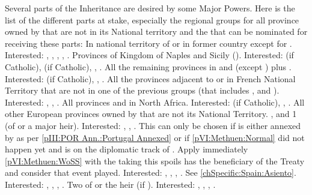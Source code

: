 \aparag Several parts of the Inheritance are desired by some Major Powers.
Here is the list of the different parts at stake, especially the regional
groups for all province owned by \SPA that are not in its National territory
and the \MAJ that can be nominated for receiving these parts:
 In national territory of \paysmajeurHollande or
in former country \paysBourgogne except for .
Interested: \FRA, \ENG, \AUS, \HOL, \SPA.
 Provinces of Kingdom of Naples and Sicily (\paysNaples).
Interested: \FRA (if Catholic), \ENG (if Catholic), \AUS, \SPA.
 All the remaining provinces in \regionItalie and
\payssuisse (except \provinceNice) plus \provinceMalta.  Interested: \FRA (if
Catholic), \AUS, \SPA.
 All the provinces adjacent to or in French National
Territory that are not in one of the previous groups (that includes
\provinceNice,  and \provinceRoussillon).  Interested:
\FRA, \AUS, \SPA.
 All provinces and \Presidios in North Africa.
Interested: \FRA (if Catholic), \ENG, \SPA.
 All other European provinces owned by \SPA that are not
its National Territory.
 \provinceGibraltar, \provinceBaleares and 1
\COL (of \HIS or a major heir).  Interested: \ENG, \HOL, \SPA.
 This can only be chosen if
\paysportugal is either annexed by \HIS as per \ref{pIII:POR Ann.:Portugal
  Annexed} or if \ref{pVI:Methuen:Normal} did not happen yet and \paysportugal
is on the diplomatic track of \HIS. Apply immediately \ref{pVI:Methuen:WoSS}
with the \MAJ taking this spoils has the beneficiary of the Treaty and
consider that event played. Interested: \FRA, \ENG, \HOL, \SPA.
\bparag[Asiento] See \ref{chSpecific:Spain:Asiento}. Interested: \FRA, \ENG,
\HOL, \SPA.
 Two \COL of \HIS or the heir (if \MAJ). Interested:
\ANG, \FRA, \HOL, \HIS.

